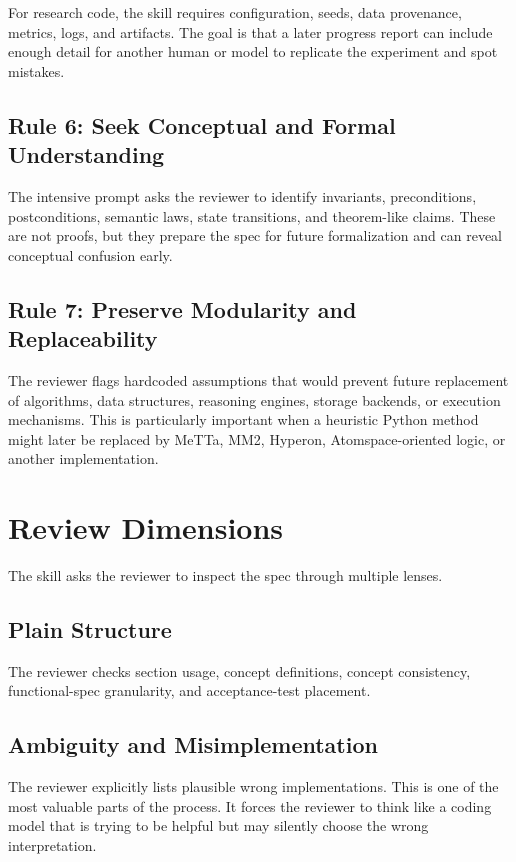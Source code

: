 \documentclass[11pt]{article}
\begin{document}
For research code, the skill requires configuration, seeds, data provenance,
metrics, logs, and artifacts. The goal is that a later progress report can
include enough detail for another human or model to replicate the experiment and
spot mistakes.

\subsection{Rule 6: Seek Conceptual and Formal Understanding}

The intensive prompt asks the reviewer to identify invariants, preconditions,
postconditions, semantic laws, state transitions, and theorem-like claims. These
are not proofs, but they prepare the spec for future formalization and can reveal
conceptual confusion early.

\subsection{Rule 7: Preserve Modularity and Replaceability}

The reviewer flags hardcoded assumptions that would prevent future replacement of
algorithms, data structures, reasoning engines, storage backends, or execution
mechanisms. This is particularly important when a heuristic Python method might
later be replaced by MeTTa, MM2, Hyperon, Atomspace-oriented logic, or another
implementation.

\section{Review Dimensions}

The skill asks the reviewer to inspect the spec through multiple lenses.

\subsection{Plain Structure}

The reviewer checks section usage, concept definitions, concept consistency,
functional-spec granularity, and acceptance-test placement.

\subsection{Ambiguity and Misimplementation}

The reviewer explicitly lists plausible wrong implementations. This is one of
the most valuable parts of the process. It forces the reviewer to think like a
coding model that is trying to be helpful but may silently choose the wrong
interpretation.
\end{document}
